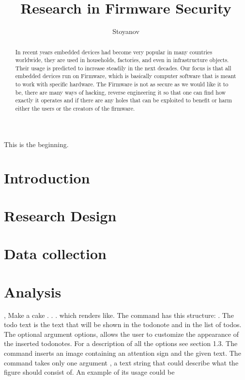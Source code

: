 \documentclass[]{report}
\title{Research in Firmware Security}
\author{Stoyanov}
\begin{document}
\maketitle

\begin{abstract}
	In recent years embedded devices had become very popular in many countries worldwide, they are used in households, factories, and even in infrastructure objects. Their usage is predicted to increase steadily in the next decades. Our focus is that all embedded devices run on Firmware, which is basically computer software that is meant to work with specific hardware. The Firmware is not as secure as we would like it to be, there are many ways of hacking, reverse engineering it so that one can find how exactly it operates and if there are any holes that can be exploited to benefit or harm either the users or the creators of the firmware.
\end{abstract}
This is the beginning.
\section{Introduction}
\section{Research Design}
\section{Data collection}
\section{Analysis}



,
Make a cake . . . which renders like. The \todo command has this structure: . The todo text is the text that will be shown in the todonote and in the
list of todos. The optional argument options, allows the user to customize the
appearance of the inserted todonotes. For a description of all the options see
section 1.3.
\missingfigure The \missingfigure command inserts an image containing an attention sign
and the given text. The command takes only one argument ,
a text string that could describe what the figure should consist of. An example of
its usage could be
\end{document}
